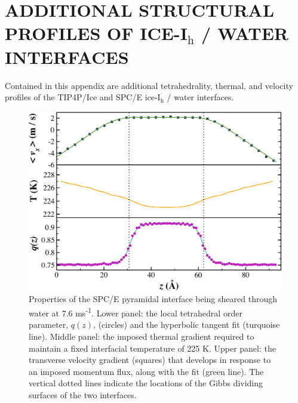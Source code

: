 \chapter{ADDITIONAL STRUCTURAL PROFILES OF ICE-I$_\mathrm{h}$ / WATER INTERFACES}\label{structAppendix}

Contained in this appendix are additional tetrahedrality, thermal, and
velocity profiles of the TIP4P/Ice and SPC/E ice-I$_\mathrm{h}$
/ water interfaces.


\begin{figure}
\includegraphics[width=\linewidth]{Figures/Pyr_comic_strip}
\caption{\label{fig:pyrComic} Properties of the SPC/E pyramidal
  interface being sheared through water at 7.6
  ms\textsuperscript{-1}. Lower panel: the local tetrahedral order
  parameter, $q(z)$, (circles) and the hyperbolic tangent fit
  (turquoise line).  Middle panel: the imposed thermal gradient
  required to maintain a fixed interfacial temperature of 225 K. Upper
  panel: the transverse velocity gradient (squares) that develops in
  response to an imposed momentum flux, along with the fit (green
  line). The vertical dotted lines indicate the locations of the Gibbs
  dividing surfaces of the two interfaces.}
\end{figure}

